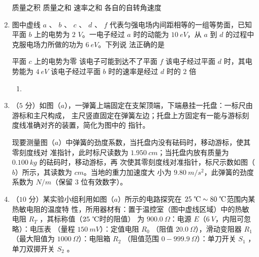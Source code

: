 \begin{enumerate}
\fourchoices
{质量之积}
{质量之和}
{速率之和}
{各自的自转角速度}

\banswer{

}


\item
图中虚线 $ a $ 、 $ b $ 、 $ c $ 、 $ d $ 、 $ f $ 代表匀强电场内间距相等的一组等势面，已知平面 $ b $ 上的电势为 $ 2 $
$ V $。一电子经过 $ a $ 时的动能为 $ 10 \ eV $，从 $ a $ 到 $ d $ 的过程中克服电场力所做的功为 $ 6 \ eV $。下列说
法正确的是  

\begin{figure}[h!]
\centering

\end{figure}

\fourchoices
{平面 $ c $ 上的电势为零}
{该电子可能到达不了平面 $ f $}
{该电子经过平面 $ d $ 时，其电势能为 $ 4 \ eV $}
{该电子经过平面 $ b $ 时的速率是经过 $ d $ 时的 $ 2 $ 倍}

\banswer{

}


\newpage
\begin{enumerate}[leftmargin=-2em]
\renewcommand{\labelenumii}{}
\item
{}
\end{enumerate}


\item
（$ 5 $ 分）如图（$ a $），一弹簧上端固定在支架顶端，下端悬挂一托盘：一标尺由游标和主尺构成，
主尺竖直固定在弹簧左边；托盘上方固定有一能与游标刻度线准确对齐的装置，简化为图中的
指针。

现要测量图（$ a $）中弹簧的劲度系数，当托盘内没有砝码时，移动游标，使其零刻度线对
准指针，此时标尺读数为 $ 1.950 \ cm $；当托盘内放有质量为 $ 0.100 \ kg $ 的砝码时，移动游标，再
次使其零刻度线对准指针，标尺示数如图（$ b $）所示，其读数为  $ cm $。当地的重力加速度大
小为 $ 9.80 \ m/s^{2} $，此弹簧的劲度系数为  $ N/m $（保留 $ 3 $ 位有效数字）。
\begin{figure}[h!]
\centering

\end{figure}


\newpage

\item 
（$ 10 $ 分）某实验小组利用如图（$ a $）所示的电路探究在 $ 25 \ \celsius \sim 80 \ \celsius $范围内某热敏电阻的温度特
性，所用器材有：置于温控室（图中虚线区域）中的热敏电阻 $ R_T $ ，其标称值（$ 25 \ \celsius $时的阻值）
为 $ 900.0 \ \Omega $：电源 $ E $（$ 6 \ V $，内阻可忽略）：电压表
\voltmetermytikz 
（量程 $ 150 \ mV $）：定值电阻 $ R_{0} $ （阻值 $ 20.0 \ \Omega $），滑动变阻器 $ R_{1} $（最大阻值为 $ 1000 \ \Omega $）：电阻箱 $ R_{2} $ （阻值范围 $ 0-999.9 \ \Omega $）：单刀开关 $ S_{1} $ ，
单刀双掷开关 $ S_{2} $ 。
\begin{figure}[h!]
\centering

\end{figure}




\end{enumerate}
